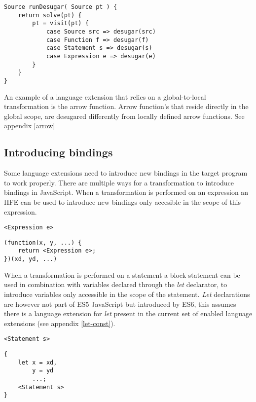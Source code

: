 \begin{lstlisting}[caption=Final desugar visitor, language=rascal]
Source runDesugar( Source pt ) {
	return solve(pt) {
		pt = visit(pt) {
			case Source src => desugar(src)
			case Function f => desugar(f)
			case Statement s => desugar(s)
			case Expression e => desugar(e)
		}
	}
}
\end{lstlisting}

An example of a language extension that relies on a global-to-local transformation is the arrow function. Arrow function's that reside directly in the global scope, are desugared differently from locally defined arrow functions. See appendix \ref{arrow}

\subsection{Introducing bindings}
Some language extensions need to introduce new bindings in the target program to work properly. There are multiple ways for a transformation to introduce bindings in JavaScript. When a transformation is performed on an expression an IIFE can be used to introduce new bindings only accesible in the scope of this expression.

\begin{minipage}[t]{0.45\linewidth}
\begin{lstlisting}
<Expression e>
\end{lstlisting}
\end{minipage}
\hfill
\begin{minipage}[t]{0.45\linewidth}
\begin{lstlisting}
(function(x, y, ...) {
	return <Expression e>;
})(xd, yd, ...)
\end{lstlisting}
\end{minipage}

When a transformation is performed on a statement a block statement can be used in combination with variables declared through the \textit{let} declarator, to introduce variables only accessible in the scope of the statement. \textit{Let} declarations are however not part of ES5 JavaScript but introduced by ES6, this assumes there is a language extension for \textit{let} present in the current set of enabled language extensions (see appendix \ref{let-const}).

\begin{minipage}[t]{0.45\linewidth}
\begin{lstlisting}
<Statement s>
\end{lstlisting}
\end{minipage}
\hfill
\begin{minipage}[t]{0.45\linewidth}
\begin{lstlisting}
{
	let x = xd,
		y = yd
		...;
	<Statement s>
}
\end{lstlisting}
\end{minipage}

